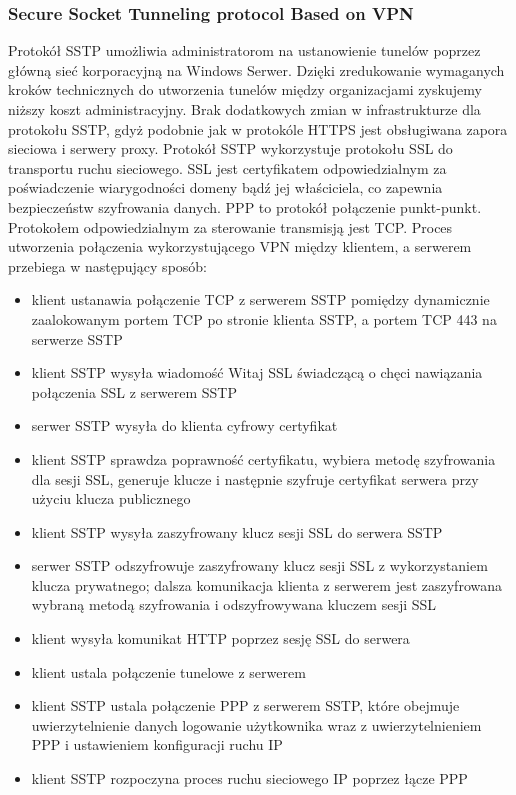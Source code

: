 \documentclass[12p]{article}
\begin{document}
\subsubsection{Secure Socket Tunneling protocol Based on VPN}
\quad Protokół SSTP umożliwia administratorom na ustanowienie tunelów poprzez główną sieć korporacyjną na Windows Serwer. Dzięki zredukowanie wymaganych kroków technicznych do utworzenia tunelów między organizacjami zyskujemy niższy koszt administracyjny. Brak dodatkowych zmian w infrastrukturze dla protokołu SSTP, gdyż podobnie jak w protokóle HTTPS jest obsługiwana zapora sieciowa i serwery proxy. Protokół SSTP wykorzystuje protokołu SSL do transportu ruchu sieciowego. SSL jest certyfikatem odpowiedzialnym za poświadczenie wiarygodności domeny bądź jej właściciela, co zapewnia bezpieczeństw szyfrowania danych. PPP to protokół połączenie punkt-punkt. Protokołem odpowiedzialnym za sterowanie transmisją jest TCP. 
Proces utworzenia połączenia wykorzystującego VPN między klientem, a serwerem przebiega w następujący sposób:
\begin{itemize}
\item klient ustanawia połączenie TCP z serwerem SSTP pomiędzy dynamicznie zaalokowanym portem TCP po stronie klienta SSTP, a portem TCP 443 na serwerze SSTP
\item klient SSTP wysyła wiadomość Witaj SSL świadczącą o chęci nawiązania połączenia SSL z serwerem SSTP
\item serwer SSTP wysyła do klienta cyfrowy certyfikat
\item klient SSTP sprawdza poprawność certyfikatu, wybiera metodę szyfrowania dla sesji SSL, generuje klucze i następnie szyfruje certyfikat serwera przy użyciu klucza publicznego
\item klient SSTP wysyła zaszyfrowany klucz sesji SSL do serwera SSTP
\item serwer SSTP odszyfrowuje zaszyfrowany klucz sesji SSL z wykorzystaniem klucza prywatnego; dalsza komunikacja klienta z serwerem jest zaszyfrowana wybraną metodą szyfrowania i odszyfrowywana kluczem sesji SSL
\item klient wysyła komunikat HTTP poprzez sesję SSL do serwera
\item klient ustala połączenie tunelowe z serwerem
\item klient SSTP ustala połączenie PPP z serwerem SSTP, które obejmuje uwierzytelnienie danych logowanie użytkownika wraz z uwierzytelnieniem PPP i ustawieniem konfiguracji ruchu IP
\item klient SSTP rozpoczyna proces ruchu sieciowego IP poprzez łącze PPP~\cite{SSTP}
\end{itemize}
\end{document}
